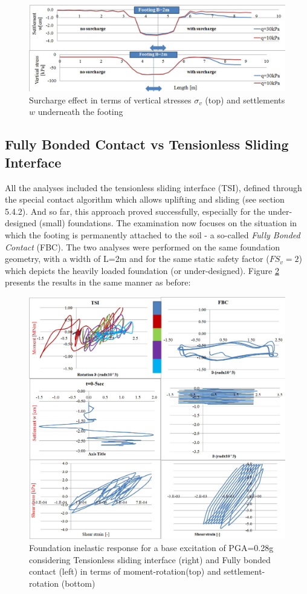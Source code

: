 	\begin{figure}[!h]
		\centering
		\includegraphics[width=0.9 \linewidth]{"surcharge"}
		\caption{Surcharge effect in terms of vertical stresses $\sigma_v$ (top) and settlements $w$ underneath the footing}
		\label{maxax}
	\end{figure}
	
\newpage
\subsection{Fully Bonded Contact vs Tensionless Sliding Interface}
All the analyses included the tensionless sliding interface (TSI), defined through the special contact algorithm which allows uplifting and sliding (see section 5.4.2). And so far, this approach proved successfully, especially for the under-designed (small) foundations. The examination now focuses on the situation in which the footing is permanently attached to the soil - a so-called \textit{Fully Bonded Contact} (FBC). The two analyses were performed on the same foundation geometry, with a width of L=2m and for the same static safety factor ($FS_v=2$) which depicts the heavily loaded foundation (or under-designed). Figure \ref{fbctsi} presents the results in the same manner as before:

 
 \begin{figure}[!h]
 	\centering
 	\includegraphics[width=0.8 \linewidth]{"fbctsi2"}
 	\caption{Foundation inelastic response for a base excitation of PGA=0.28g considering Tensionless sliding interface (right) and Fully bonded contact (left) in terms of moment-rotation(top) and settlement-rotation (bottom)}
 	\label{fbctsi}
 \end{figure}

